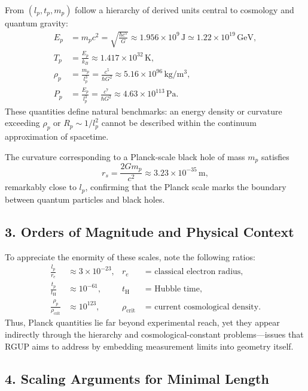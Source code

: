 \documentclass[11pt,oneside]{book}
\numberwithin{equation}{chapter}
\begin{document}
From $(l_p, t_p, m_p)$ follow a hierarchy of derived units central to cosmology and quantum gravity:
\begin{align*}
E_p &= m_p c^2 = \sqrt{\frac{\hbar c^5}{G}} \approx 1.956\times10^9\,\mathrm{J}
\simeq 1.22\times10^{19}\,\mathrm{GeV}, \\[4pt]
T_p &= \frac{E_p}{k_B} \approx 1.417\times10^{32}\,\mathrm{K}, \\[4pt]
\rho_p &= \frac{m_p}{l_p^3} = \frac{c^5}{\hbar G^2} \approx 5.16\times10^{96}\,\mathrm{kg/m^3}, \\[4pt]
P_p &= \frac{E_p}{l_p^3} = \frac{c^7}{\hbar G^2} \approx 4.63\times10^{113}\,\mathrm{Pa}.
\end{align*}
These quantities define natural benchmarks: an energy density or curvature exceeding $\rho_p$ or $R_p \sim 1/l_p^2$ cannot be described within the continuum approximation of spacetime.

The curvature corresponding to a Planck-scale black hole of mass $m_p$ satisfies
\begin{equation}
r_s = \frac{2Gm_p}{c^2} \approx 3.23\times10^{-35}\,\mathrm{m},
\end{equation}
remarkably close to $l_p$, confirming that the Planck scale marks the boundary between quantum particles and black holes.  

\subsection*{3. Orders of Magnitude and Physical Context}

To appreciate the enormity of these scales, note the following ratios:
\begin{align*}
\frac{l_p}{r_e} &\approx 3\times10^{-23}, & r_e &\text{ = classical electron radius},\\[3pt]
\frac{t_p}{t_\mathrm{H}} &\approx 10^{-61}, & t_\mathrm{H} &\text{ = Hubble time},\\[3pt]
\frac{\rho_p}{\rho_\mathrm{crit}} &\approx 10^{123}, & \rho_\mathrm{crit} &\text{ = current cosmological density}.
\end{align*}
Thus, Planck quantities lie far beyond experimental reach, yet they appear indirectly through the hierarchy and cosmological-constant problems—issues that RGUP aims to address by embedding measurement limits into geometry itself.

\subsection*{4. Scaling Arguments for Minimal Length}
\end{document}
